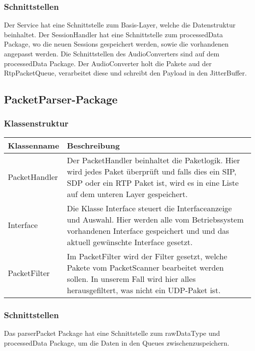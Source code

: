 \documentclass[a4,12pt]{scrartcl}
\begin{document}
\subsubsection{Schnittstellen}
Der Service hat eine Schnittstelle zum Basis-Layer, welche die Datenstruktur beinhaltet. Der SessionHandler hat eine Schnittstelle zum processedData Package, wo die neuen Sessions gespeichert werden, sowie die vorhandenen angepasst werden.
Die Schnittstellen des AudioConverters sind auf dem processedData Package. Der AudioConverter holt die Pakete aud der RtpPacketQueue, verarbeitet diese und schreibt den Payload in den JitterBuffer.

\subsection{PacketParser-Package}
\subsubsection{Klassenstruktur}
\begin{table}[H]
\centering
    \begin{tabular}{@{}l p{11cm} @{}}\toprule    
    {Klassenname} & {Beschreibung}\\ \midrule
     PacketHandler& 
Der PacketHandler beinhaltet die Paketlogik. Hier wird jedes Paket überprüft und falls dies ein SIP, SDP oder ein RTP Paket ist, wird es in eine Liste auf dem unteren Layer gespeichert.
 \\ \addlinespace
     Interface&  
Die Klasse Interface steuert die Interfaceanzeige und Auswahl. Hier werden alle vom Betriebssystem vorhandenen Interface gespeichert und und das aktuell gewünschte Interface gesetzt.
\\ \addlinespace
     PacketFilter&  
Im PacketFilter wird der Filter gesetzt, welche Pakete vom PacketScanner bearbeitet werden sollen. In unserem Fall wird hier alles herausgefiltert, was nicht ein UDP-Paket ist.
\\ 
    
    \bottomrule
    \end{tabular}
\end{table}
\subsubsection{Schnittstellen}
Das parserPacket Package hat eine Schnittstelle zum rawDataType und processedData Package, um die Daten in den Queues zwischenzuspeichern.
\end{document}
